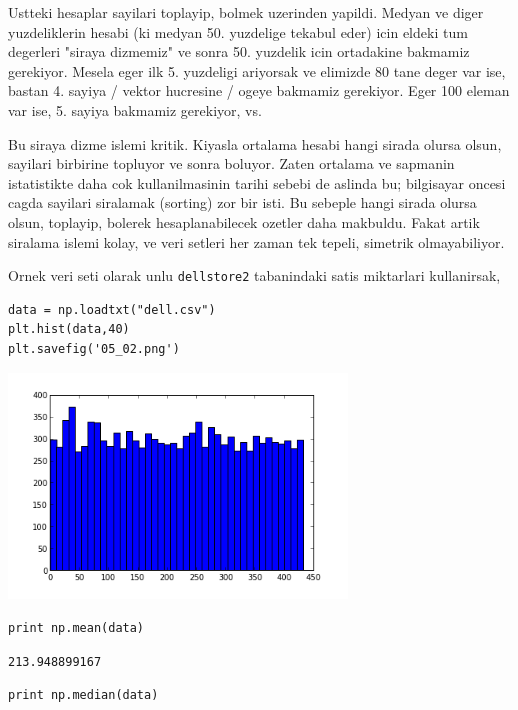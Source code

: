 \documentclass[12pt,fleqn]{article}\usepackage{../common}
\begin{document}
Ustteki hesaplar sayilari toplayip, bolmek uzerinden yapildi. Medyan
ve diger yuzdeliklerin hesabi (ki medyan 50. yuzdelige tekabul eder)
icin eldeki tum degerleri "siraya dizmemiz" ve sonra 50. yuzdelik icin
ortadakine bakmamiz gerekiyor. Mesela eger ilk 5. yuzdeligi ariyorsak
ve elimizde 80 tane deger var ise, bastan 4. sayiya / vektor hucresine
/ ogeye bakmamiz gerekiyor. Eger 100 eleman var ise, 5. sayiya
bakmamiz gerekiyor, vs.

Bu siraya dizme islemi kritik. Kiyasla ortalama hesabi hangi sirada olursa
olsun, sayilari birbirine topluyor ve sonra boluyor. Zaten ortalama ve
sapmanin istatistikte daha cok kullanilmasinin tarihi sebebi de aslinda bu;
bilgisayar oncesi cagda sayilari siralamak (sorting) zor bir isti. Bu
sebeple hangi sirada olursa olsun, toplayip, bolerek hesaplanabilecek
ozetler daha makbuldu. Fakat artik siralama islemi kolay, ve veri setleri
her zaman tek tepeli, simetrik olmayabiliyor. 

Ornek veri seti olarak unlu \verb!dellstore2! tabanindaki satis miktarlari
kullanirsak, 

\begin{verbatim}
data = np.loadtxt("dell.csv")
plt.hist(data,40)
plt.savefig('05_02.png')
\end{verbatim}

\includegraphics[height=6cm]{05_02.png}

\begin{verbatim}
print np.mean(data)
\end{verbatim}

\begin{verbatim}
213.948899167
\end{verbatim}

\begin{verbatim}
print np.median(data)
\end{verbatim}
\end{document}
